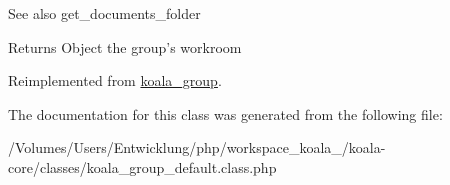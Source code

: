 \begin{DoxySeeAlso}{See also}
get\_\-documents\_\-folder
\end{DoxySeeAlso}
\begin{DoxyReturn}{Returns}
Object the group's workroom 
\end{DoxyReturn}


Reimplemented from \hyperlink{classkoala__group}{koala\_\-group}.



The documentation for this class was generated from the following file:\begin{DoxyCompactItemize}
\item 
/Volumes/Users/Entwicklung/php/workspace\_\-koala\_/koala-\/core/classes/koala\_\-group\_\-default.class.php\end{DoxyCompactItemize}
